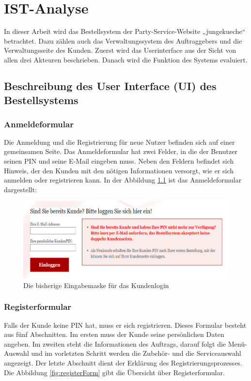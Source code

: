 \chapter{IST-Analyse}
In dieser Arbeit wird das Bestellsystem der Party-Service-Website „jungekueche“ betrachtet. Dazu zählen auch das Verwaltungssystem des Auftraggebers und die Verwaltungsseite des Kunden. Zuerst wird das Userinterface aus der Sicht von allen drei Akteuren beschrieben. Danach wird die Funktion des Systems evaluiert.

\section{Beschreibung des User Interface (UI) des Bestellsystems} 

\subsection{Anmeldeformular}
Die Anmeldung und die Registrierung für neue Nutzer befinden sich auf einer gemeinsamen Seite. Das Anmeldeformular hat zwei Felder, in die der Benutzer seinen PIN und seine E-Mail eingeben muss. Neben den Feldern befindet sich Hinweis, der den Kunden mit den nötigen Informationen versorgt, wie er sich anmelden oder registrieren kann. In der Abbildung \ref{fig:anmeldeformular} ist das Anmeldeformular dargestellt:


\begin{figure}[h]
	\centering
	\includegraphics[width=0.7\linewidth]{Graphics/anmeldeformular.png}
	\caption[Anmeldeformular]{Die bisherige Eingabemaske für das Kundenlogin}
	\label{fig:anmeldeformular}
\end{figure}


\subsection{Registerformular}

Falls der Kunde keine PIN hat, muss er sich registrieren. Dieses Formular besteht aus fünf Abschnitten. Im ersten muss der Kunde seine persönlichen Daten angeben. Im zweiten steht die Informationen des Auftrags, darauf folgt die Menü-Auswahl und im vorletzten Schritt werden die Zubehör- und die Serviceauswahl angezeigt. Der letzte Abschnitt dient der Erklärung des Registrierungsprozesses. Die Abbildung \ref{fig:registerForm} gibt die Übersicht über Registerformular.

